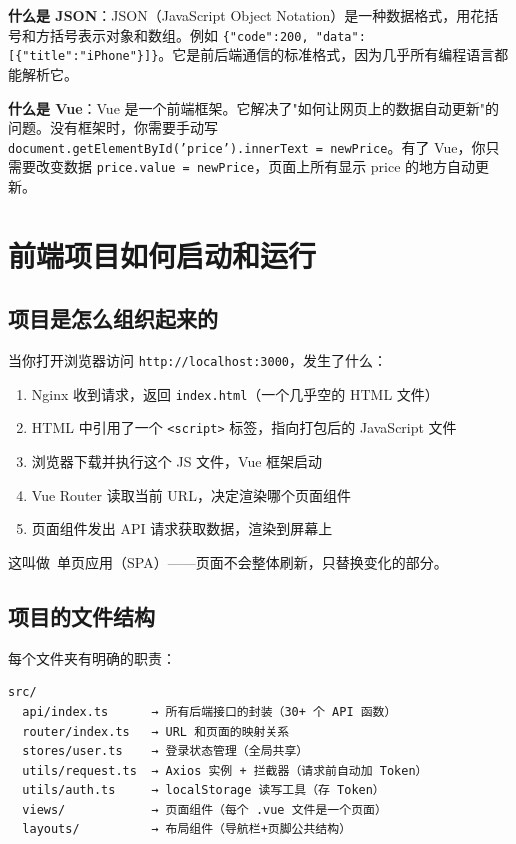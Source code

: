 \documentclass[12pt,a4paper]{ctexart}
\begin{document}
\textbf{什么是 JSON}：JSON（JavaScript Object Notation）是一种数据格式，用花括号和方括号表示对象和数组。例如 \texttt{\{"code":200, "data":[\{"title":"iPhone"\}]\}}。它是前后端通信的标准格式，因为几乎所有编程语言都能解析它。

\textbf{什么是 Vue}：Vue 是一个前端框架。它解决了"如何让网页上的数据自动更新"的问题。没有框架时，你需要手动写 \texttt{document.getElementById('price').innerText = newPrice}。有了 Vue，你只需要改变数据 \texttt{price.value = newPrice}，页面上所有显示 price 的地方自动更新。

\section{前端项目如何启动和运行}

\subsection{项目是怎么组织起来的}

当你打开浏览器访问 \texttt{http://localhost:3000}，发生了什么：

\begin{enumerate}
  \item Nginx 收到请求，返回 \texttt{index.html}（一个几乎空的 HTML 文件）
  \item HTML 中引用了一个 \texttt{<script>} 标签，指向打包后的 JavaScript 文件
  \item 浏览器下载并执行这个 JS 文件，Vue 框架启动
  \item Vue Router 读取当前 URL，决定渲染哪个页面组件
  \item 页面组件发出 API 请求获取数据，渲染到屏幕上
\end{enumerate}

这叫做\ 单页应用（SPA）——页面不会整体刷新，只替换变化的部分。

\subsection{项目的文件结构}

每个文件夹有明确的职责：

\begin{verbatim}
src/
  api/index.ts      → 所有后端接口的封装（30+ 个 API 函数）
  router/index.ts   → URL 和页面的映射关系
  stores/user.ts    → 登录状态管理（全局共享）
  utils/request.ts  → Axios 实例 + 拦截器（请求前自动加 Token）
  utils/auth.ts     → localStorage 读写工具（存 Token）
  views/            → 页面组件（每个 .vue 文件是一个页面）
  layouts/          → 布局组件（导航栏+页脚公共结构）
\end{verbatim}
\end{document}
